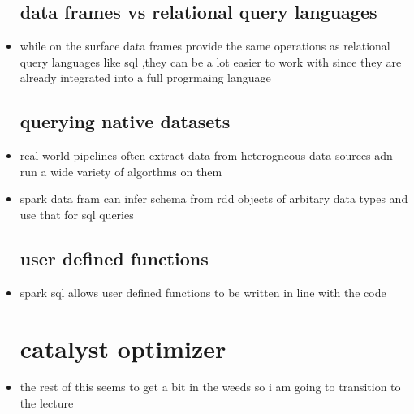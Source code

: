 \documentclass{article}
\begin{document}
\begin{itemize}
\subsection*{data frames vs relational query languages}
\item while on the surface data frames provide the same operations as relational query languages like sql ,they can be a lot easier to work with since they are already integrated into a full progrmaing language
\subsection*{querying native datasets}
\item real world pipelines often extract data from heterogneous data sources adn run a wide variety of algorthms on them 
\item spark data fram can infer schema from rdd objects of arbitary data types and use that for sql queries 
\subsection*{user defined functions}
\item spark sql allows user defined functions to be written in line with the code
\section*{catalyst optimizer}
\item the rest of this seems to get a bit in the weeds so i am going to transition to the lecture 
\end{itemize}
\end{document}
